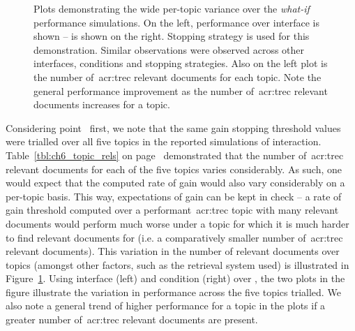 \begin{figure}[t!]
    \centering
    \caption[Per-topic performance variation example]{Plots demonstrating the wide per-topic variance over the \emph{what-if} performance simulations. On the left, performance over interface  is shown –  is shown on the right. Stopping strategy  is used for this demonstration. Similar observations were observed across other interfaces, conditions and stopping strategies. Also  on the left plot is the number of~\gls{acr:trec} relevant documents for each topic. Note the general performance improvement as the number of~\gls{acr:trec} relevant documents increases for a topic.}
    \label{fig:per_topic_differences}
\end{figure}

Considering point~ first, we note that the same gain stopping threshold values were trialled over all five topics in the reported simulations of interaction. Table~\ref{tbl:ch6_topic_rels} on page~\pageref{tbl:ch6_topic_rels} demonstrated that the number of~\gls{acr:trec} relevant documents for each of the five topics varies considerably. As such, one would expect that the computed rate of gain would also vary considerably on a per-topic basis. This way, expectations of gain can be kept in check -- a rate of gain threshold computed over a performant~\gls{acr:trec} topic with many relevant documents would perform much worse under a topic for which it is much harder to find relevant documents for (i.e. a comparatively smaller number of~\gls{acr:trec} relevant documents). This variation in the number of relevant documents over topics (amongst other factors, such as the retrieval system used) is illustrated in Figure~\ref{fig:per_topic_differences}. Using interface  (left) and condition  (right) over , the two plots in the figure illustrate the variation in performance across the five topics trialled. We also note a general trend of higher performance for a topic in the plots if a greater number of~\gls{acr:trec} relevant documents are present.

